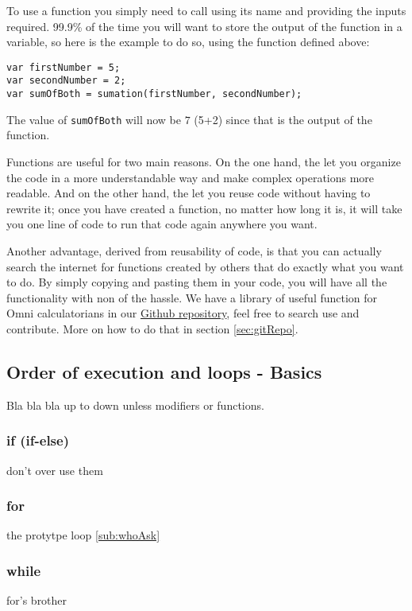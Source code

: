 To use a function you simply need to call using its name and providing the inputs required. 99.9\% of the time you will want to store the output of the function in a variable, so here is the example to do so, using the function defined above:
\begin{lstlisting}
var firstNumber = 5;
var secondNumber = 2;
var sumOfBoth = sumation(firstNumber, secondNumber);
\end{lstlisting}

The value of \texttt{sumOfBoth} will now be $7$ (5+2) since that is the output of the function. 

Functions are useful for two main reasons. On the one hand, the let you organize the code in a more understandable way and make complex operations more readable. And on the other hand, the let you reuse code without having to rewrite it; once you have created a function, no matter how long it is, it will take you one line of code to run that code again anywhere you want.

Another advantage, derived from reusability of code, is that you can actually search the internet for functions created by others that do exactly what you want to do. By simply copying and pasting them in your code, you will have all the functionality with non of the hassle. We have a library of useful function for Omni calculatorians in our \href{https://github.com/AlGepe/OmniSnippets_JS/tree/master}{Github repository}, feel free to search use and contribute. More on how to do that in section \ref{sec:gitRepo}.

\subsection{Order of execution and loops - Basics}
\label{sub:execBasic}
Bla bla bla up to down unless modifiers or functions.
\subsubsection{if (if-else)}
\label{subsub:if}
don't over use them

\subsubsection{for}
\label{subsub:for}
the protytpe loop \ref{sub:whoAsk}

\subsubsection{while}
\label{sub:while}
for's brother

